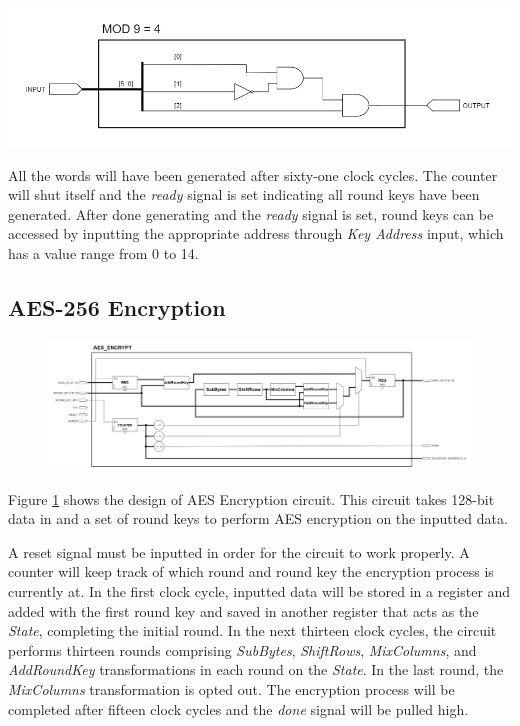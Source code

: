 \documentclass[a4paper, 10pt]{article}
\newenvironment{Figure}
    {\par\medskip\noindent\minipage{\linewidth}}
    {\endminipage\par\medskip}
\begin{document}
\begin{multicols}{2}
            \noindent
            \begin{Figure}
                \centering
                \includegraphics[width=\linewidth]{Mod9Eq4.png}
                \label{fig:mod9eq4}
            \end{Figure}

            All the words will have been generated after sixty-one clock cycles. The counter will shut itself and the \textit{ready} signal is set indicating all round keys have been generated. After done generating and the \textit{ready} signal is set, round keys can be accessed by inputting the appropriate address through \textit{Key Address} input, which has a value range from 0 to 14.
            
            \subsection{AES-256 Encryption}

	\noindent
            \begin{figure}[t]
                \centering
                \includegraphics[width=\linewidth]{AES_encrypt.png}
                \label{fig:AES_encrypt}
            \end{figure}

	Figure \ref{fig:AES_encrypt} shows the design of AES Encryption circuit. This circuit takes 128-bit data in and a set of round keys to perform AES encryption on the inputted data.

	A reset signal must be inputted in order for the circuit to work properly. A counter will keep track of which round and round key the encryption process is currently at. In the first clock cycle, inputted data will be stored in a register and added with the first round key and saved in another register that acts as the \textit{State}, completing the initial round. In the next thirteen clock cycles, the circuit performs thirteen rounds comprising \textit{SubBytes}, \textit{ShiftRows}, \textit{MixColumns}, and \textit{AddRoundKey} transformations in each round on the \textit{State}. In the last round, the \textit{MixColumns} transformation is opted out. The encryption process will be completed after fifteen clock cycles and the \textit{done} signal will be pulled high.
	

\end{multicols}
\end{document}
